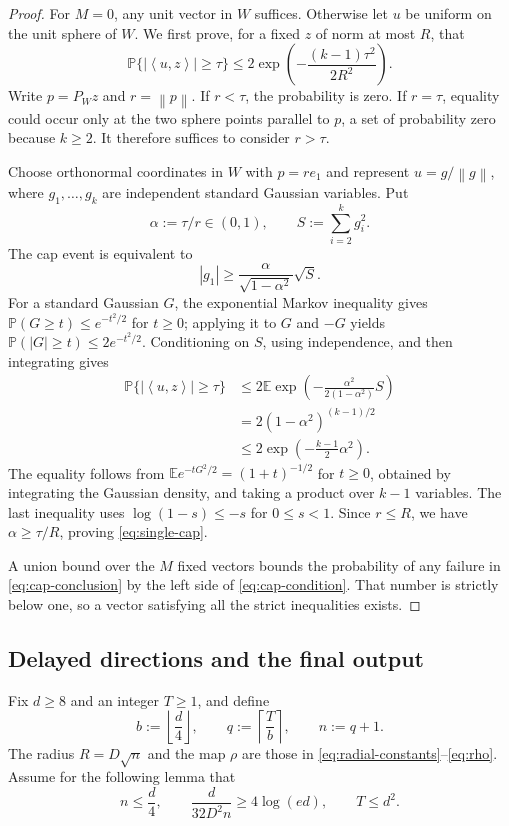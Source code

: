 \documentclass[11pt]{article}
\numberwithin{equation}{section}
\theoremstyle{definition}
\theoremstyle{remark}
\newcommand{\norm}[1]{\left\lVert #1\right\rVert}
\newcommand{\ip}[2]{\left\langle #1,#2\right\rangle}
\newcommand{\E}{\mathbb{E}}
\newcommand{\Prob}{\mathbb{P}}
\begin{document}
\begin{proof}
For $M=0$, any unit vector in $W$ suffices. Otherwise let $u$ be uniform
on the unit sphere of $W$. We first prove, for a fixed $z$ of norm at most
$R$, that
\begin{equation}
    \Prob\{|\ip{u}{z}|\geq\tau\}
    \leq2\exp\!\left(-\frac{(k-1)\tau^2}{2R^2}\right).
    \label{eq:single-cap}
\end{equation}
Write $p=P_Wz$ and $r=\norm{p}$. If $r<\tau$, the probability is zero.
If $r=\tau$, equality could occur only at the two sphere points parallel
to $p$, a set of probability zero because $k\geq2$.
It therefore suffices to consider $r>\tau$.

Choose orthonormal coordinates in $W$ with $p=re_1$ and represent
$u=g/\norm{g}$, where $g_1,\ldots,g_k$ are independent standard Gaussian
variables. Put
\[
    \alpha:=\tau/r\in(0,1),\qquad S:=\sum_{i=2}^k g_i^2.
\]
The cap event is equivalent to
\[
    |g_1|\geq\frac{\alpha}{\sqrt{1-\alpha^2}}\sqrt S.
\]
For a standard Gaussian $G$, the exponential Markov inequality gives
$\Prob(G\geq t)\leq e^{-t^2/2}$ for $t\geq0$; applying it to $G$ and
$-G$ yields $\Prob(|G|\geq t)\leq2e^{-t^2/2}$.
Conditioning on $S$, using independence, and then integrating gives
\begin{align*}
    \Prob\{|\ip{u}{z}|\geq\tau\}
    &\leq2\E\exp\!\left(-\frac{\alpha^2}{2(1-\alpha^2)}S\right)\\
    &=2(1-\alpha^2)^{(k-1)/2}\\
    &\leq2\exp\!\left(-\frac{k-1}{2}\alpha^2\right).
\end{align*}
The equality follows from
$\E e^{-tG^2/2}=(1+t)^{-1/2}$ for $t\geq0$, obtained by integrating the
Gaussian density, and taking a product over $k-1$ variables.
The last inequality uses $\log(1-s)\leq-s$ for $0\leq s<1$.
Since $r\leq R$, we have $\alpha\geq\tau/R$, proving \eqref{eq:single-cap}.

A union bound over the $M$ fixed vectors bounds the probability of any
failure in \eqref{eq:cap-conclusion} by the left side of
\eqref{eq:cap-condition}. That number is strictly below one, so a vector
satisfying all the strict inequalities exists.
\end{proof}

\subsection{Delayed directions and the final output}

Fix $d\geq8$ and an integer $T\geq1$, and define
\begin{equation}
    b:=\left\lfloor\frac d4\right\rfloor,\qquad
    q:=\left\lceil\frac Tb\right\rceil,\qquad n:=q+1.
    \label{eq:blocks}
\end{equation}
The radius $R=D\sqrt n$ and the map $\rho$ are those in
\eqref{eq:radial-constants}--\eqref{eq:rho}. Assume for the following lemma
that
\begin{equation}
    n\leq\frac d4,\qquad
    \frac{d}{32D^2n}\geq4\log(ed),\qquad T\leq d^2.
    \label{eq:frame-hypotheses}
\end{equation}
\end{document}
